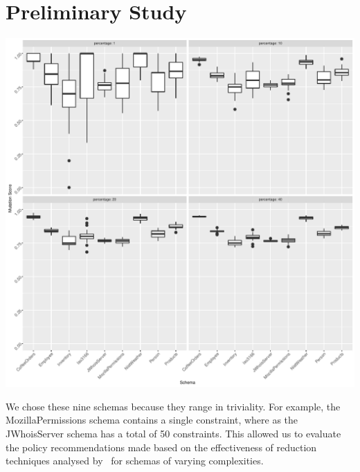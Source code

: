 \section{Preliminary Study}



\hspace*{-1em}\includegraphics[scale = 0.5]{graphs/schema_vs_ms.pdf}

We chose these nine schemas because they range in triviality. For example, the MozillaPermissions schema contains a
single constraint, where as the JWhoisServer schema has a total of 50 constraints. This allowed us to evaluate the
policy recommendations made based on the effectiveness of reduction techniques analysed by \mr~for schemas of varying
complexities.

